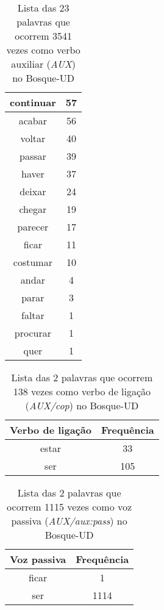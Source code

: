 \documentclass[output=paper,colorlinks,citecolor=brown]{langscibook}
\begin{document}
\begin{table}[]
{\begin{tabular}{|c|c|}
				continuar & 57\\\hline
				acabar & 56\\\hline
				voltar & 40\\\hline
				passar & 39\\\hline
				haver & 37\\\hline
				deixar & 24\\\hline
				chegar & 19\\\hline
				parecer & 17\\\hline
				ficar & 11\\\hline
				costumar & 10\\\hline
				andar & 4\\\hline
				parar & 3\\\hline
				faltar & 1\\\hline
				procurar & 1\\\hline
				quer & 1\\\hline
			\end{tabular}
		}
		\caption{Lista das 23 palavras que ocorrem 3541 vezes como verbo auxiliar (\emph{AUX}) no Bosque-UD}
		\label{tab:aux}
	\end{table}
	
	\begin{table}[]
		\centering
		\begin{tabular}{|c|c|}
			\hline
			\textbf{Verbo de ligação} & \textbf{Frequência} \\\hline
			estar & 33\\\hline
			ser & 105\\\hline
		\end{tabular}
		\caption{Lista das 2 palavras que ocorrem 138 vezes como verbo de ligação (\emph{AUX/cop}) no Bosque-UD}
		\label{tab:verbosdeligacao}
	\end{table}

	\begin{table}[]
		\centering
		\begin{tabular}{|c|c|}
			\hline
			\textbf{Voz passiva} & \textbf{Frequência} \\\hline
			ficar & 1\\\hline
			ser & 1114\\\hline
		\end{tabular}
		\caption{Lista das 2 palavras que ocorrem 1115 vezes como voz passiva (\emph{AUX/aux:pass}) no Bosque-UD}
		\label{tab:vozpassiva}
	\end{table}
\end{document}
